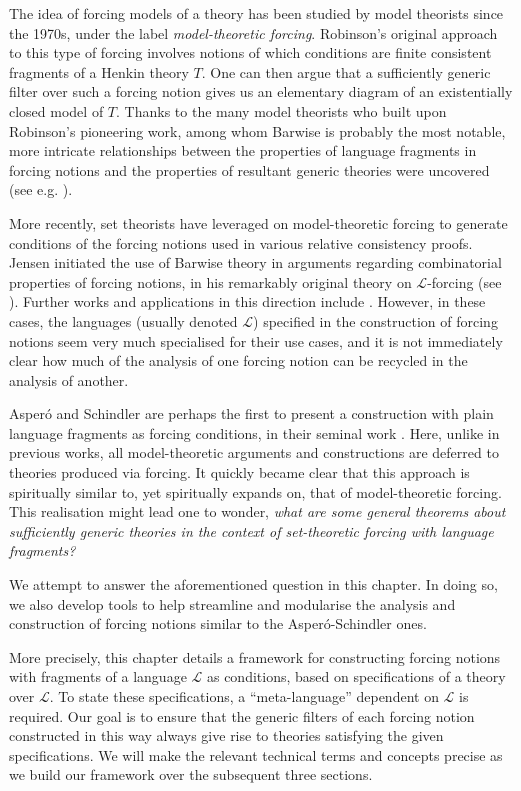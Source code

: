 \documentclass[12pt, twoside]{memoir}
\numberwithin{equation}{section}
\theoremstyle{definition}
\theoremstyle{remark}
\theoremstyle{definition}
\theoremstyle{definition}
\theoremstyle{definition}
\theoremstyle{remark}
\begin{document}
The idea of forcing models of a theory has been studied by model theorists since the 1970s, under the label \emph{model-theoretic forcing}. Robinson's original approach to this type of forcing involves notions of which conditions are finite consistent fragments of a Henkin theory $T$. One can then argue that a sufficiently generic filter over such a forcing notion gives us an elementary diagram of an existentially closed model of $T$. Thanks to the many model theorists who built upon Robinson's pioneering work, among whom Barwise is probably the most notable, more intricate relationships between the properties of language fragments in forcing notions and the properties of resultant generic theories were uncovered (see e.g. \cite{keisler}).

More recently, set theorists have leveraged on model-theoretic forcing to generate conditions of the forcing notions used in various relative consistency proofs. Jensen initiated the use of Barwise theory in arguments regarding combinatorial properties of forcing notions, in his remarkably original theory on $\mathcal{L}$-forcing (see \cite{lforcing}). Further works and applications in this direction include \cite{doebler}. However, in these cases, the languages (usually denoted $\mathcal{L}$) specified in the construction of forcing notions seem very much specialised for their use cases, and it is not immediately clear how much of the analysis of one forcing notion can be recycled in the analysis of another. 

Asper\'{o} and Schindler are perhaps the first to present a construction with plain language fragments as forcing conditions, in their seminal work \cite{schindler}. Here, unlike in previous works, all model-theoretic arguments and constructions are deferred to theories produced via forcing. It quickly became clear that this approach is spiritually similar to, yet spiritually expands on, that of model-theoretic forcing. This realisation might lead one to wonder, \textit{what are some general theorems about sufficiently generic theories in the context of set-theoretic forcing with language fragments?}

We attempt to answer the aforementioned question in this chapter. In doing so, we also develop tools to help streamline and modularise the analysis and construction of forcing notions similar to the Asper\'{o}-Schindler ones.

More precisely, this chapter details a framework for constructing forcing notions with fragments of a language $\mathcal{L}$ as conditions, based on specifications of a theory over $\mathcal{L}$. To state these specifications, a ``meta-language'' dependent on $\mathcal{L}$ is required. Our goal is to ensure that the generic filters of each forcing notion constructed in this way always give rise to theories satisfying the given specifications. We will make the relevant technical terms and concepts precise as we build our framework over the subsequent three sections.
\end{document}
